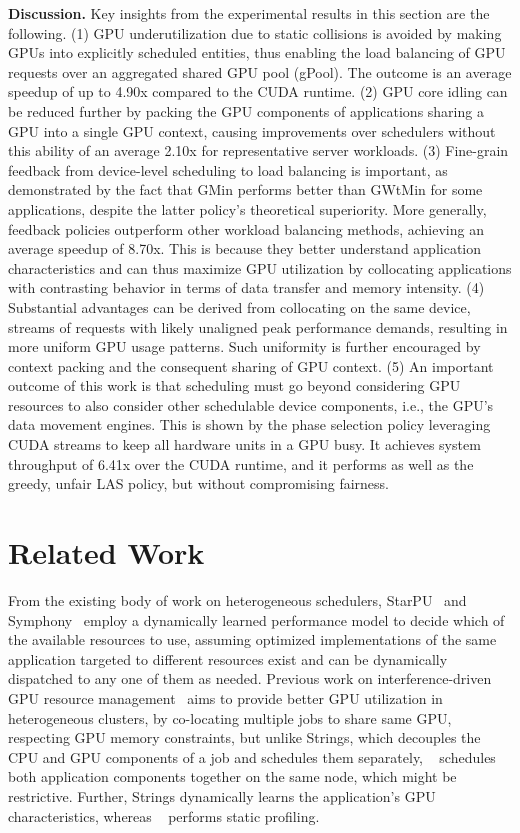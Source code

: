\textbf{Discussion. }Key insights from the experimental results in this section are the following. (1) GPU underutilization due to static collisions is avoided by making GPUs into explicitly scheduled entities, thus enabling the load balancing of GPU requests over an aggregated shared GPU pool (gPool). The outcome is an average speedup of up to 4.90x compared to the CUDA runtime. (2) GPU core idling can be reduced further by packing the GPU components of applications sharing a GPU into a single GPU context, causing improvements over schedulers without this ability of an average 2.10x for representative server workloads. (3) Fine-grain feedback from device-level scheduling to load balancing is important, as demonstrated by the fact that GMin performs better than GWtMin for some applications, despite the latter policy’s theoretical superiority. More generally, feedback policies outperform other workload balancing methods, achieving an average speedup of 8.70x. This is because they better understand application characteristics and can thus maximize GPU utilization by collocating applications with contrasting behavior in terms of data transfer and memory intensity. (4) Substantial advantages can be derived from collocating on the same device, streams of requests with likely unaligned peak performance demands, resulting in more uniform GPU usage patterns. Such uniformity is further encouraged by context packing and the consequent sharing of GPU context. (5) An important outcome of this work is that scheduling must go beyond considering GPU resources to also consider other schedulable device components, i.e., the GPU’s data movement engines. This is shown by the phase selection policy leveraging CUDA streams to keep all hardware units in a GPU busy. It achieves system throughput of 6.41x over the CUDA runtime, and it performs as well as the greedy, unfair LAS policy, but without compromising fairness.

\section{Related Work}
From the existing body of work on heterogeneous schedulers, StarPU~\cite{starpu} and Symphony~\cite{symphony} employ a dynamically learned performance model to decide which of the available resources to use, assuming optimized implementations of the same application targeted to different resources exist and can be dynamically dispatched to any one of them as needed. Previous work on interference-driven GPU resource management~\cite{phull} aims to provide better GPU utilization in heterogeneous clusters, by co-locating multiple jobs to share same GPU, respecting GPU memory constraints, but unlike Strings, which decouples the CPU and GPU components of a job and schedules them separately, ~\cite{phull} schedules both application components together on the same node, which might be restrictive. Further, Strings dynamically learns the application’s GPU characteristics, whereas ~\cite{phull} performs static profiling. 


